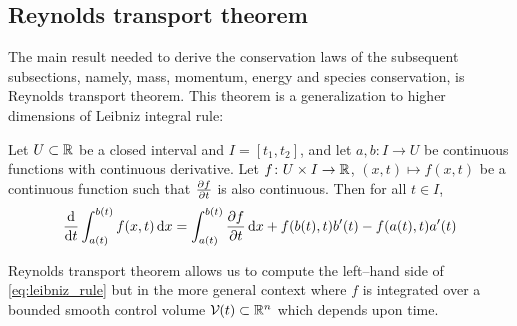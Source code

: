 
\subsection{Reynolds transport theorem}

The main result needed to derive the conservation laws of the subsequent subsections, namely, mass, momentum, energy and species conservation, is Reynolds transport theorem. This theorem is a generalization to higher dimensions of Leibniz integral rule:

\begin{theorem}
	Let $U \subset \mathbb{R}$ be a closed interval and $I = [t_1, t_2]$, and let $a, b \colon I \rightarrow U$ be continuous functions with continuous derivative. Let $f \colon U \times I \rightarrow \mathbb{R}$, $(x,t) \mapsto f(x,t)$ be a continuous function such that $\pdv{f}{t}$ is also continuous. Then for all $t \in I$,
	\begin{equation} \label{eq:leibniz_rule}
		\frac{\dd}{\dd{t}} \int_{a(t)}^{b(t)} f(x,t) \dd{x} = 
		\int_{a(t)}^{b(t)} \pdv{f}{t}(x,t) \dd{x} + f(b(t),t) b'(t) - f(a(t),t) a'(t)
	\end{equation}
\end{theorem}

\noindent
Reynolds transport theorem allows us to compute the left--hand side of \eqref{eq:leibniz_rule} but in the more general context where $f$ is integrated over a bounded smooth control volume $\mathcal{V}_{}(t) \subset \mathbb{R}^n$ which depends upon time. 


